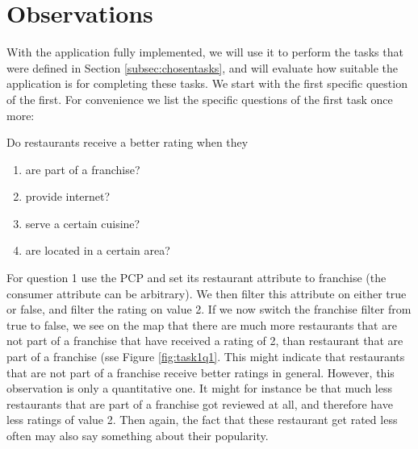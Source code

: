 \section{Observations}\label{sec:observations}




With the application fully implemented, we will use it to perform the tasks that were defined in Section \ref{subsec:chosentasks}, and will evaluate how suitable the application is for completing these tasks. We start with the first specific question of the first. For convenience we list the specific questions of the first task once more:

Do restaurants receive a better rating when they
\begin{enumerate}
\setlength{\itemsep}{0cm}%
\setlength{\parskip}{0cm}%
\item are part of a franchise?
\item provide internet?
\item serve a certain cuisine?
\item are located in a certain area?
\end{enumerate}

For question 1 use the PCP and set its restaurant attribute to franchise (the consumer attribute can be arbitrary). We then filter this attribute on either true or false, and filter the rating on value 2. If we now switch the franchise filter from true to false, we see on the map that there are much more restaurants that are not part of a franchise that have received a rating of 2, than restaurant that are part of a franchise (sse Figure \ref{fig:task1q1}. This might indicate that restaurants that are not part of a franchise receive better ratings in general. However, this observation is only a quantitative one. It might for instance be that much less restaurants that are part of a franchise got reviewed at all, and therefore have less ratings of value 2. Then again, the fact that these restaurant get rated less often may also say something about their popularity.

